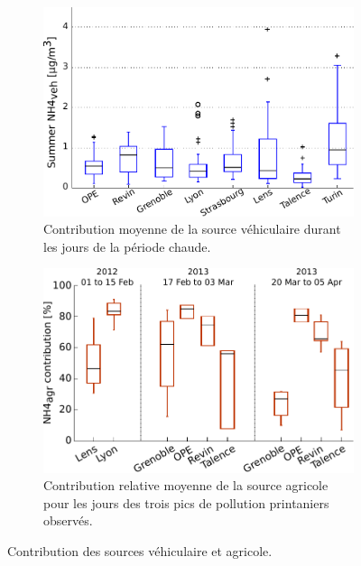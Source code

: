 \begin{figure}[ht]
    \begin{subfigure}[t]{0.5\textwidth}
    \begin{center}
    \includegraphics[width=.9\textwidth]{figures/INACS/MCA_contribSummerVeh.pdf}
    \end{center}
    \caption{Contribution moyenne de la source véhiculaire durant les jours de la période chaude.}
    \label{fig:summerNH4}
    \end{subfigure}
    \begin{subfigure}[t]{0.5\textwidth}
    \begin{center}
    \includegraphics[width=.9\textwidth]{figures/INACS/MCA_contribSpringEventAgr.pdf}
    \end{center}
    \caption{Contribution relative moyenne de la source agricole pour les jours des trois
    pics de pollution printaniers observés.}
    \label{fig:contribSpringAgr}
    \end{subfigure}
    \caption{Contribution des sources véhiculaire et agricole.}
\end{figure}


